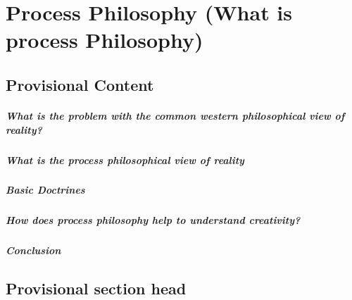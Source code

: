 \chapter{Process Philosophy (What is process Philosophy)}




\section{Provisional Content}
\paragraph{What is the problem with the common western philosophical view of reality?}
\paragraph{What is the process philosophical view of reality}
\paragraph{Basic Doctrines}
\paragraph{How does process philosophy help to understand creativity?}
\paragraph{Conclusion}

\section{Provisional section head}




